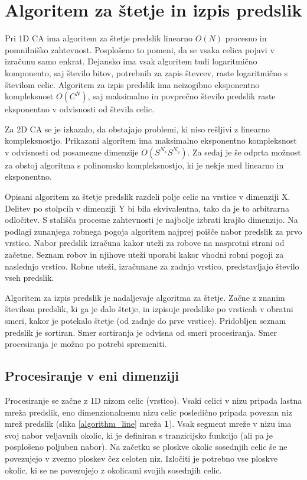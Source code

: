 \documentclass[12pt,a4paper,openany,twoside]{book}
\begin{document}
\chapter{Algoritem za štetje in izpis predslik}

Pri 1D CA ima algoritem za štetje predslik linearno \(O(N)\) procesno in pomnilniško zahtevnost.
Posplošeno to pomeni, da se vsaka celica pojavi v izračunu samo enkrat.
Dejansko ima vsak algoritem tudi logaritmično komponento,
saj število bitov, potrebnih za zapis števcev, raste logaritmično s številom celic.
Algoritem za izpis predslik ima neizogibno eksponentno kompleksnost \(O(C^N)\),
saj maksimalno in povprečno število predslik raste eksponentno
v odvisnosti od števila celic.

Za 2D CA se je izkazalo, da obstajajo problemi, ki niso rešljivi z linearno kompleksnostjo.
Prikazani algoritem ima maksimalno eksponentno kompleksnost
v odvisnosti od posamezne dimenzije \(O(S^{N_x} S^{N_y})\).
Za sedaj je še odprta možnost za obstoj algoritma s polinomsko kompleksnostjo,
ki je nekje med linearno in eksponentno.

Opisani algoritem za štetje predslik razdeli polje celic na vrstice v dimenziji X.
Delitev po stolpcih v dimenziji Y bi bila ekvivalentna, tako da je to arbitrarna odločitev.
S stališča procesne zahtevnosti je najbolje izbrati krajšo dimenzijo.
Na podlagi zunanjega robnega pogoja algoritem najprej poišče nabor predslik za prvo vrstico.
Nabor predslik izračuna kakor uteži za robove na nasprotni strani od začetne.
Seznam robov in njihove uteži uporabi kakor vhodni robni pogoji za naslednjo vrstico.
Robne uteži, izračunane za zadnjo vrstico, predstavljajo število vseh predslik.

Algoritem za izpis predslik je nadaljevaje algoritma za štetje.
Začne z znanim številom predslik, ki ga je dalo štetje, in izpisuje predslike
po vrsticah v obratni smeri, kakor je potekalo štetje (od zadnje do prve vrstice).
Pridobljen seznam predslik je sortiran. Smer sortiranja je odvisna od smeri procesiranja.
Smer procesiranja je možno po potrebi spremeniti.

\section{Procesiranje v eni dimenziji}

Procesiranje se začne z 1D nizom celic (vrstico).
Vsaki celici v nizu pripada lastna mreža predslik, eno dimenzionalnemu nizu celic
posledično pripada povezan niz mrež predslik (slika \ref{algorithm_line} mreža \textbf{1}).
Vsak segment mreže v nizu ima svoj nabor veljavnih okolic,
ki je definiran s tranzicijsko funkcijo (ali pa je posplošeno poljuben nabor).
Na začetku se ploskve okolic sosednjih celic še ne povezujejo v
zvezno ploskev čez celoten niz. Izločiti je potrebno vse ploskve okolic,
ki se ne povezujejo z okolicami svojih sosednjih celic.
\end{document}
